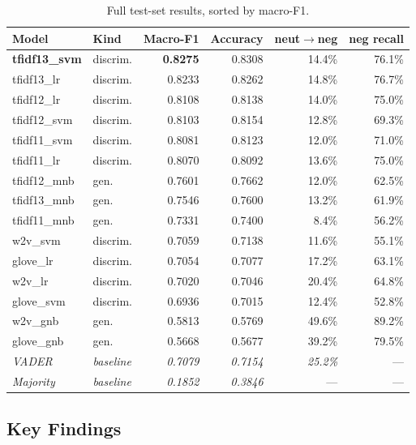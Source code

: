 \documentclass[11pt,a4paper]{article}
\begin{document}
\begin{table}[H]
\centering
\caption{Full test-set results, sorted by macro-F1.}
\label{tab:results}
\footnotesize
\begin{tabular}{llrrrr}
\toprule
\textbf{Model} & \textbf{Kind} & \textbf{Macro-F1} & \textbf{Accuracy} & \textbf{neut$\rightarrow$neg} & \textbf{neg recall} \\
\midrule
\textbf{tfidf13\_svm} & discrim. & \textbf{0.8275} & 0.8308 & 14.4\% & 76.1\% \\
tfidf13\_lr  & discrim. & 0.8233 & 0.8262 & 14.8\% & 76.7\% \\
tfidf12\_lr  & discrim. & 0.8108 & 0.8138 & 14.0\% & 75.0\% \\
tfidf12\_svm & discrim. & 0.8103 & 0.8154 & 12.8\% & 69.3\% \\
tfidf11\_svm & discrim. & 0.8081 & 0.8123 & 12.0\% & 71.0\% \\
tfidf11\_lr  & discrim. & 0.8070 & 0.8092 & 13.6\% & 75.0\% \\
tfidf12\_mnb & gen.     & 0.7601 & 0.7662 & 12.0\% & 62.5\% \\
tfidf13\_mnb & gen.     & 0.7546 & 0.7600 & 13.2\% & 61.9\% \\
tfidf11\_mnb & gen.     & 0.7331 & 0.7400 & 8.4\%  & 56.2\% \\
w2v\_svm     & discrim. & 0.7059 & 0.7138 & 11.6\% & 55.1\% \\
glove\_lr    & discrim. & 0.7054 & 0.7077 & 17.2\% & 63.1\% \\
w2v\_lr      & discrim. & 0.7020 & 0.7046 & 20.4\% & 64.8\% \\
glove\_svm   & discrim. & 0.6936 & 0.7015 & 12.4\% & 52.8\% \\
w2v\_gnb     & gen.     & 0.5813 & 0.5769 & 49.6\% & 89.2\% \\
glove\_gnb   & gen.     & 0.5668 & 0.5677 & 39.2\% & 79.5\% \\
\midrule
\textit{VADER}    & \textit{baseline} & \textit{0.7079} & \textit{0.7154} & \textit{25.2\%} & --- \\
\textit{Majority} & \textit{baseline} & \textit{0.1852} & \textit{0.3846} & --- & --- \\
\bottomrule
\end{tabular}
\end{table}

\subsection{Key Findings}
\end{document}
